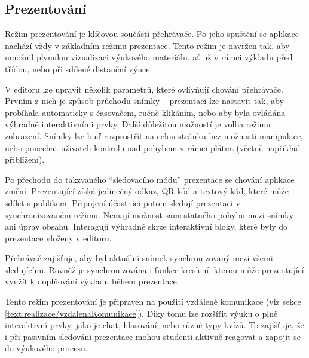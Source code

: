 \subsection{Prezentování}


Režim prezentování je klíčovou součástí přehrávače. 
Po jeho spuštění se aplikace nachází vždy v základním režimu prezentace. 
Tento režim je navržen tak, aby umožnil plynulou vizualizaci výukového materiálu, ať už v rámci výkladu před třídou, nebo při sdílené distanční výuce.

V editoru lze upravit několik parametrů, které ovlivňují chování přehrávače.
Prvním z nich je způsob průchodu snímky -- prezentaci lze nastavit tak, aby probíhala automaticky s časovačem, ručně klikáním, nebo aby byla ovládána výhradně interaktivními prvky.
Další důležitou možností je volba režimu zobrazení.
Snímky lze buď rozprostřít na celou stránku bez možnosti manipulace, nebo ponechat uživateli kontrolu nad pohybem v rámci plátna (včetně například přiblížení).

Po přechodu do takzvaného \enquote{sledovacího módu} prezentace se chování aplikace změní. 
Prezentující získá jedinečný odkaz, QR kód a textový kód, které může sdílet s publikem. 
Připojení účastníci potom sledují prezentaci v synchronizovaném režimu. 
Nemají možnost samostatného pohybu mezi snímky ani úprav obsahu. 
Interagují výhradně skrze interaktivní bloky, které byly do prezentace vloženy v editoru.

Přehrávač zajišťuje, aby byl aktuální snímek synchronizovaný mezi všemi sledujícími.
Rovněž je synchronizována i funkce kreslení, kterou může prezentující využít k doplňování výkladu během prezentace.

Tento režim prezentování je připraven na použití vzdálené komunikace (viz sekce \ref{text:realizace/vzdalenaKomunikace}).
Díky tomu lze rozšířit výuku o plně interaktivní prvky, jako je chat, hlasování, nebo různé typy kvízů. 
To zajišťuje, že i při pasivním sledování prezentace mohou studenti aktivně reagovat a zapojit se do výukového procesu.


